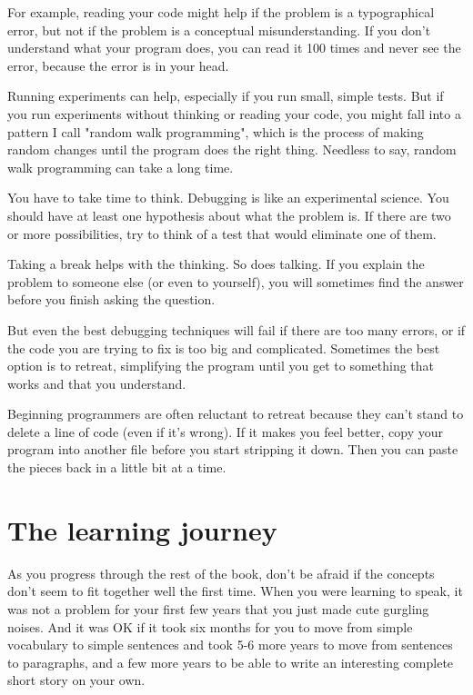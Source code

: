 For example, reading your code might help if the problem is a
typographical error, but not if the problem is a conceptual
misunderstanding. If you don't understand what your program does, you
can read it 100 times and never see the error, because the error is in
your head.


Running experiments can help, especially if you run small, simple tests.
But if you run experiments without thinking or reading your code, you
might fall into a pattern I call "random walk programming", which is the
process of making random changes until the program does the right thing.
Needless to say, random walk programming can take a long time.


You have to take time to think. Debugging is like an experimental
science. You should have at least one hypothesis about what the problem
is. If there are two or more possibilities, try to think of a test that
would eliminate one of them.

Taking a break helps with the thinking. So does talking. If you explain
the problem to someone else (or even to yourself), you will sometimes
find the answer before you finish asking the question. 

But even the best debugging techniques will fail if there are too many
errors, or if the code you are trying to fix is too big and complicated.
Sometimes the best option is to retreat, simplifying the program until
you get to something that works and that you understand.

Beginning programmers are often reluctant to retreat because they can't
stand to delete a line of code (even if it's wrong). If it makes you
feel better, copy your program into another file before you start
stripping it down. Then you can paste the pieces back in a little bit at
a time. 

\section{The learning journey}

As you progress through the rest of the book, don't be afraid if the concepts 
don't seem to fit together well the first time.  When you were learning to speak, 
it was not a problem  for your first few years that you just made cute gurgling noises.
And it was OK if it took six months for you to move from simple vocabulary to 
simple sentences and took 5-6 more years to move from sentences to paragraphs, and a
few more years to be able to write an interesting complete short story on your own.

